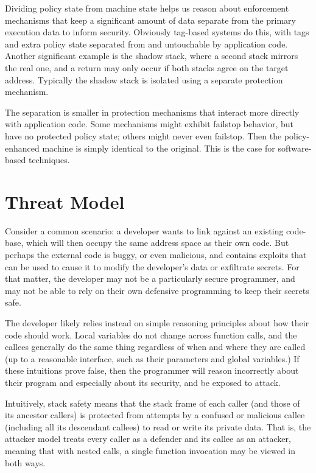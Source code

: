\documentclass[acmsmall,review,anonymous]{acmart}\settopmatter{printfolios=true,printccs=false,printacmref=false}
\begin{document}
Dividing policy state from machine state helps us reason about
enforcement mechanisms that keep a significant amount of data separate from the
primary execution data to inform security. Obviously tag-based systems do this,
with tags and extra policy state separated from and untouchable by application code.
Another significant example is the shadow stack, where a second stack
mirrors the real one, and a return may only occur if both stacks agree on the
target address. Typically the shadow stack is isolated using a separate protection
mechanism.

The separation is smaller in protection mechanisms that interact more directly
with application code. Some mechanisms might exhibit failstop behavior, but have
no protected policy state; others might never even failstop. Then the policy-enhanced
machine is simply identical to the original. This is the case for software-based
techniques.

\section{Threat Model}
\label{sec:threat}

Consider a common scenario: a developer wants to link against an existing
code-base, which will then occupy the same address space as their own code.
But perhaps the external code is buggy, or even malicious, and contains
exploits that can be used to cause it to modify the developer's data or
exfiltrate secrets. For that matter, the developer may not be a particularly
secure programmer, and may not be able to rely on their own defensive programming
to keep their secrets safe.

The developer likely relies instead on simple reasoning principles about how
their code should work. Local variables do not change across function calls,
and the callees generally do the same thing regardless of when and where they
are called (up to a reasonable interface, such as their parameters and global
variables.) If these intuitions prove false, then the programmer will reason
incorrectly about their program and especially about its security, and
be exposed to attack.

Intuitively, stack safety means that the stack frame of each caller (and
those of its ancestor callers) is protected
from attempts by a confused or malicious callee (including all its
descendant callees)
to read or write its private data.
That is, the attacker model treats every caller as a defender and its callee as
an attacker, meaning that with nested calls, a single function invocation
may be viewed in both ways.
\end{document}
